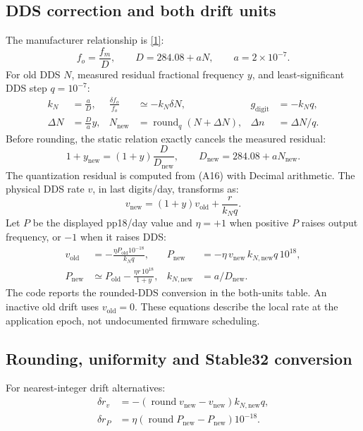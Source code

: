 \documentclass[11pt,a4paper]{article}
\newcommand{\manual}{\href{https://www.gb.nrao.edu/~fghigo/timer/MSMmaser/Maser_UG_75666-201_Rev_J.PDF}{[1]}}
\begin{document}
\subsection{DDS correction and both drift units}
The manufacturer relationship is \manual:
\begin{equation}
f_o=\frac{f_m}{D},\qquad D=284.08+aN,\qquad a=2\times10^{-7}. \tag{A13}
\end{equation}
For old DDS \(N\), measured residual fractional frequency \(y\), and
least-significant DDS step \(q=10^{-7}\):
\begin{align}
k_N&=\frac{a}{D},&
\frac{\delta f_o}{f_o}&\simeq-k_N\delta N,&
g_{\mathrm{digit}}&=-k_Nq, \tag{A14}\\
\Delta N&=\frac{D}{a}y,&
N_{\mathrm{new}}&=\operatorname{round}_{q}(N+\Delta N),&
\Delta n&=\Delta N/q. \tag{A15}
\end{align}
Before rounding, the static relation exactly cancels the measured residual:
\begin{equation}
1+y_{\mathrm{new}}=(1+y)\frac{D}{D_{\mathrm{new}}},\qquad
D_{\mathrm{new}}=284.08+aN_{\mathrm{new}}. \tag{A16}
\end{equation}
The quantization residual is computed from (A16) with Decimal arithmetic.
The physical DDS rate \(v\), in last digits/day, transforms as:
\begin{equation}
v_{\mathrm{new}}=(1+y)v_{\mathrm{old}}+\frac{r}{k_Nq}. \tag{A17}
\end{equation}
Let \(P\) be the displayed pp18/day value and \(\eta=+1\) when positive \(P\)
raises output frequency, or \(-1\) when it raises DDS:
\begin{align}
v_{\mathrm{old}}&=-\frac{\eta P_{\mathrm{old}}10^{-18}}{k_Nq},&
P_{\mathrm{new}}&=-\eta\,v_{\mathrm{new}}\,k_{N,\mathrm{new}}q\,10^{18}, \tag{A18}\\
P_{\mathrm{new}}&\simeq P_{\mathrm{old}}-
       \frac{\eta r\,10^{18}}{1+y},&
k_{N,\mathrm{new}}&=a/D_{\mathrm{new}}. \tag{A19}
\end{align}
The code reports the rounded-DDS conversion in the both-units table.
An inactive old drift uses \(v_{\mathrm{old}}=0\). These equations describe
the local rate at the application epoch, not undocumented firmware scheduling.
\clearpage

\subsection{Rounding, uniformity and Stable32 conversion}
For nearest-integer drift alternatives:
\begin{align}
\delta r_v&=-(\operatorname{round}v_{\mathrm{new}}-v_{\mathrm{new}})
               k_{N,\mathrm{new}}q, \tag{A20}\\
\delta r_P&=\eta(\operatorname{round}P_{\mathrm{new}}-P_{\mathrm{new}})10^{-18}.
 \tag{A21}
\end{align}
\end{document}
